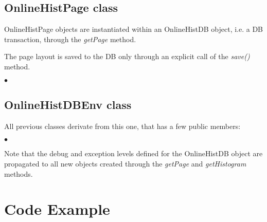 \documentclass{lhcbnote}
\begin{document}
\subsection{OnlineHistPage class}

OnlineHistPage objects are instantiated within an
OnlineHistDB object, i.e. a DB transaction, through the {\it
getPage} method.

The page layout is saved to the DB only through an explicit call of
the {\it save()} method.

\begin{list}{$\bullet$}{}

\end{list}


\subsection{OnlineHistDBEnv class}\label{dbenvclass}
All previous classes derivate from this one, that has a few public
members:
\begin{list}{$\bullet$}{}

\end{list}

Note that the debug and exception levels defined for the OnlineHistDB object are
propagated to all new objects created through the {\it getPage} and
{\it getHistogram} methods.



\section{Code Example}
\end{document}
